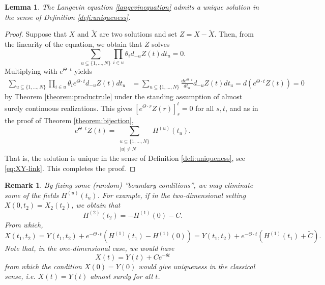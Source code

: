 \documentclass[english, a4paper, 12pt,reqno]{amsart}
\newtheorem{lemma}[defi]{Lemma}
\newtheorem{rem}[defi]{Remark}
\begin{document}
\begin{lemma}
\label{lemma:uniqueness}
The Langevin equation \eqref{langevinequation} admits a unique solution in the sense of Definition \ref{defi:uniqueness}.
\end{lemma}
\begin{proof}
Suppose that $X$ and $\tilde{X}$ are two solutions and set $Z= X-\tilde{X}$. Then, from the linearity of the equation, we obtain that $Z$ solves
\begin{equation*}
\sum_{u\subseteq\{1,\dots,N\}} \prod _{i\in u}\theta_i d_{-u}Z(t) dt_u = 0.
\end{equation*}
Multiplying with $e^{\Theta\cdot t}$ yields
\begin{equation*}
\begin{split}
\sum_{u\subseteq\{1,\dots,N\}} \prod _{i\in u}\theta_ie^{\Theta\cdot t} d_{-u}Z(t) dt_u &= \sum_{u\subseteq\{1,\dots,N\}} \frac{d e^{\Theta\cdot t}}{dt_u} d_{-u}Z(t) dt_u = d(e^{\Theta\cdot t}Z(t)) = 0
\end{split}
\end{equation*}
by Theorem \ref{theorem:productrule} under the standing assumption of almost surely continuous realizations. This gives $[e^{\Theta \cdot r}Z(r)]_s^t = 0$ for all $s,t$, and as in the proof of Theorem \ref{theorem:bijection}, 
\begin{equation*}
e^{\Theta\cdot t}Z(t) = \sum_{\substack{u\subseteq \{1,\dots,N\}\\
|u| \neq N}}H^{(u)}(t_u).
\end{equation*}
That is, the solution is unique in the sense of Definition \ref{defi:uniqueness}, see \eqref{eq:XY-link}. This completes the proof.
\end{proof}


\begin{rem}
By fixing some (random) ''boundary conditions'', we may eliminate some of the fields $H^{(u)}(t_u)$. For example, if in the two-dimensional setting $X(0,t_2) = X_2(t_2)$, we obtain that
$$H^{(2)}(t_2) = -H^{(1)}(0) - C.$$
From which,
$$X(t_1,t_2) =Y(t_1,t_2) + e^{-\Theta \cdot t} \left(H^{(1)}(t_1) - H^{(1)}(0)\right)=Y(t_1,t_2) + e^{-\Theta \cdot t} \left(H^{(1)}(t_1)  +\tilde{C}\right).$$
Note that, in the one-dimensional case, we would have
$$
X(t) = Y(t) + Ce^{-\theta t}
$$
from which the condition $X(0)=Y(0)$ would give uniqueness in the classical sense, i.e. $X(t)=Y(t)$ almost surely for all $t$.
\end{rem}
\end{document}
